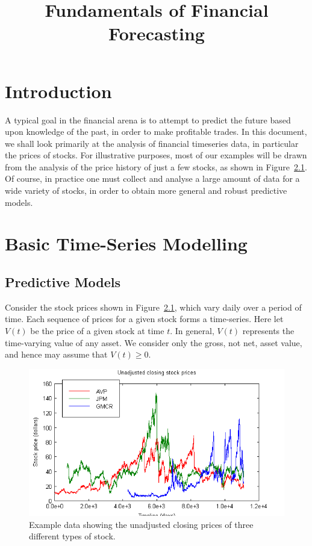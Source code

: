 \documentclass[a4paper]{book}
\title{Fundamentals of Financial Forecasting}
\begin{document}
\chapter{Introduction}
A typical goal in the financial arena is to attempt to predict the future based upon knowledge of the past, in order to make profitable trades.
In this document, we shall look primarily at the analysis of financial timeseries data, in particular the prices of stocks.
For illustrative purposes, most of our examples will be drawn from the analysis of the price history of just a few stocks, as shown
in Figure~\ref{fig:stock-prices}. Of course, in practice one must collect and analyse a large amount of data for a wide variety of stocks, 
in order to obtain more general and robust predictive models.

\chapter{Basic Time-Series Modelling}

\section{Predictive Models}
Consider the stock prices shown in Figure~\ref{fig:stock-prices},
which vary daily over a period of time.
Each sequence of prices for a given stock forms a time-series.
Here let $V(t)$ be the price of a given stock at time $t$. In general,
$V(t)$ represents the time-varying value of any asset. We
consider only the gross, not net, asset value, and hence may assume that $V(t)\ge 0$.
\begin{figure}[hbt]
\includegraphics[scale=0.8]{figures/stock-prices-close.png}
\caption{Example data showing the unadjusted closing prices of three different
types of stock.}
\label{fig:stock-prices}
\end{figure}
\end{document}
